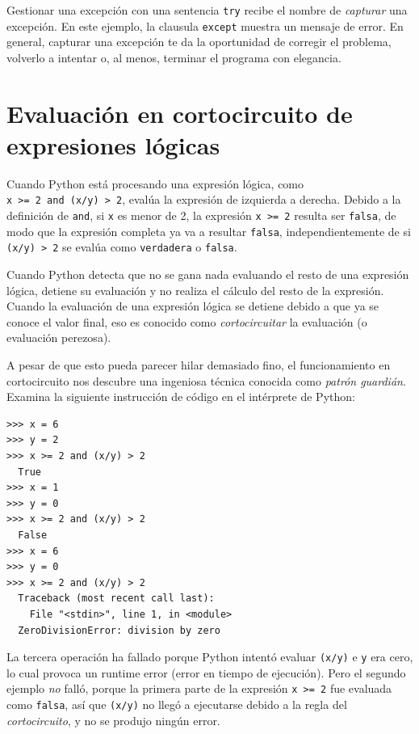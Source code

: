 Gestionar una excepción con una sentencia \texttt{try} recibe el nombre
de \emph{capturar} una excepción. En este ejemplo, la clausula
\texttt{except} muestra un mensaje de error. En general, capturar una
excepción te da la oportunidad de corregir el problema, volverlo a
intentar o, al menos, terminar el programa con elegancia.

\hypertarget{evaluaciuxf3n-en-cortocircuito-de-expresiones-luxf3gicas}{%
\section{Evaluación en cortocircuito de expresiones
lógicas}\label{evaluaciuxf3n-en-cortocircuito-de-expresiones-luxf3gicas}}


Cuando Python está procesando una expresión lógica, como
\texttt{x\ >=\ 2\ and\ (x/y)\ >\ 2}, evalúa la expresión de
izquierda a derecha. Debido a la definición de \texttt{and}, si
\texttt{x} es menor de 2, la expresión \texttt{x\ >=\ 2} resulta ser
\texttt{falsa}, de modo que la expresión completa ya va a resultar
\texttt{falsa}, independientemente de si \texttt{(x/y)\ >\ 2} se
evalúa como \texttt{verdadera} o \texttt{falsa}.

Cuando Python detecta que no se gana nada evaluando el resto de una
expresión lógica, detiene su evaluación y no realiza el cálculo del
resto de la expresión. Cuando la evaluación de una expresión lógica se
detiene debido a que ya se conoce el valor final, eso es conocido como
\emph{cortocircuitar} la evaluación (o evaluación perezosa).

A pesar de que esto pueda parecer hilar demasiado fino, el
funcionamiento en cortocircuito nos descubre una ingeniosa técnica
conocida como \emph{patrón guardián}. Examina la siguiente instrucción
de código en el intérprete de Python:

\begin{Verbatim}[frame=single]
>>> x = 6
>>> y = 2
>>> x >= 2 and (x/y) > 2
  True
>>> x = 1
>>> y = 0
>>> x >= 2 and (x/y) > 2
  False
>>> x = 6
>>> y = 0
>>> x >= 2 and (x/y) > 2
  Traceback (most recent call last):
    File "<stdin>", line 1, in <module>
  ZeroDivisionError: division by zero
\end{Verbatim}

La tercera operación ha fallado porque Python intentó evaluar
\texttt{(x/y)} e \texttt{y} era cero, lo cual provoca un runtime error
(error en tiempo de ejecución). Pero el segundo ejemplo \emph{no} falló,
porque la primera parte de la expresión \texttt{x\ >=\ 2} fue
evaluada como \texttt{falsa}, así que \texttt{(x/y)} no llegó a
ejecutarse debido a la regla del \emph{cortocircuito}, y no se produjo
ningún error.

